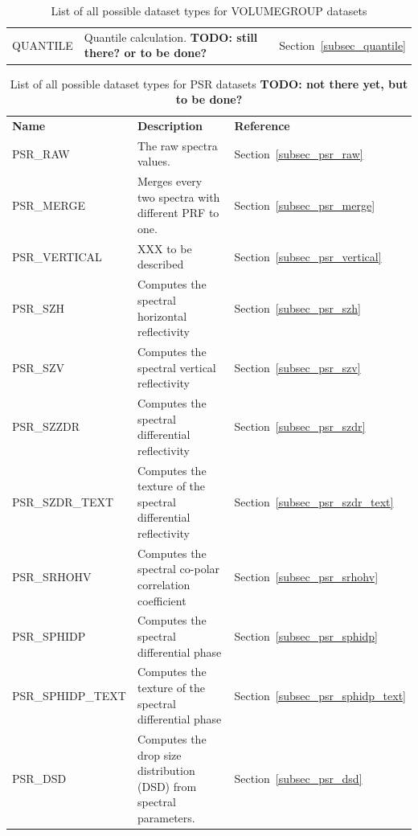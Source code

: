 \documentclass[a4paper,11pt,pdftex,twoside]{scrartcl}
\renewcommand{\bf}{\normalfont \bfseries}
\begin{document}
{{{\begin{table}[H]
\begin{tabularx}{\textwidth}{lXl}
QUANTILE      & Quantile calculation.      {\bf TODO: still there? or to be done? }                                                         & Section~\ref{subsec_quantile}\\
\end{tabularx}
\caption{List of all possible dataset types for VOLUMEGROUP datasets}
\label{tab_datasets_VOLUMEGROUP}
\end{table}

\begin{table}[H]
\begin{tabularx}{\textwidth}{lXl}
\bf{Name}             & \bf{Description}                                                    & \bf{Reference}\\
PSR\_RAW              & The raw spectra values.                                             & Section~\ref{subsec_psr_raw}\\
PSR\_MERGE            & Merges every two spectra with different PRF to one.                 & Section~\ref{subsec_psr_merge}\\
PSR\_VERTICAL         & XXX to be described                                                 & Section~\ref{subsec_psr_vertical}\\
PSR\_SZH              & Computes the spectral horizontal reflectivity                       & Section~\ref{subsec_psr_szh}\\
PSR\_SZV              & Computes the spectral vertical reflectivity                         & Section~\ref{subsec_psr_szv}\\
PSR\_SZZDR            & Computes the spectral differential reflectivity                     & Section~\ref{subsec_psr_szdr}\\
PSR\_SZDR\_TEXT       & Computes the texture of the spectral differential reflectivity      & Section~\ref{subsec_psr_szdr_text}\\
PSR\_SRHOHV           & Computes the spectral co-polar correlation coefficient              & Section~\ref{subsec_psr_srhohv}\\
PSR\_SPHIDP           & Computes the spectral differential phase                            & Section~\ref{subsec_psr_sphidp}\\
PSR\_SPHIDP\_TEXT     & Computes the texture of the spectral differential phase             & Section~\ref{subsec_psr_sphidp_text}\\
PSR\_DSD              & Computes the drop size distribution (DSD) from spectral parameters. & Section~\ref{subsec_psr_dsd}\\
\end{tabularx}
\caption{List of all possible dataset types for PSR datasets {\bf TODO: not there yet, but to be done? }                                     }
\label{tab_datasets_PSR}
\end{table}

}}}
\end{document}
